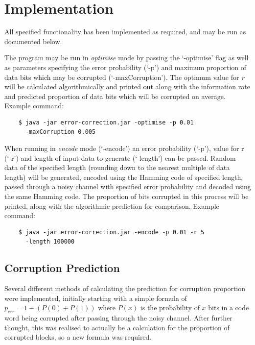 \documentclass[a4paper,11pt]{article}
\begin{document}
\pagestyle{fancy}
\fancyhead[R]{\today}
\fancyfoot[C]{\thepage}

\section{Implementation}
    All specified functionality has been implemented as required, and may be run as documented below.

    The program may be run in \textit{optimise} mode by passing the `-optimise' flag as well as parameters specifying the error probability (`-p') and maximum proportion of data bits which may be corrupted (`-maxCorruption'). The optimum value for \textit{r} will be calculated algorithmically and printed out along with the information rate and predicted proportion of data bits which will be corrupted on average. Example command:
\begin{verbatim}
    $ java -jar error-correction.jar -optimise -p 0.01
      -maxCorruption 0.005
\end{verbatim}

    When running in \textit{encode} mode (`-encode') an error probability (`-p'), value for r (`-r') and length of input data to generate (`-length') can be passed. Random data of the specified length (rounding down to the nearest multiple of data length) will be generated, encoded using the Hamming code of specified length, passed through a noisy channel with specified error probability and decoded using the same Hamming code. The proportion of bits corrupted in this process will be printed, along with the algorithmic prediction for comparison. Example command:
\begin{verbatim}
    $ java -jar error-correction.jar -encode -p 0.01 -r 5
      -length 100000
\end{verbatim}

    \subsection{Corruption Prediction}
        Several different methods of calculating the prediction for corruption proportion were implemented, initially starting with a simple formula of $p_{err} = 1 - (P(0) + P(1))$ where $P(x)$ is the probability of $x$ bits in a code word being corrupted after passing through the noisy channel. After further thought, this was realised to actually be a calculation for the proportion of corrupted blocks, so a new formula was required.
\end{document}

